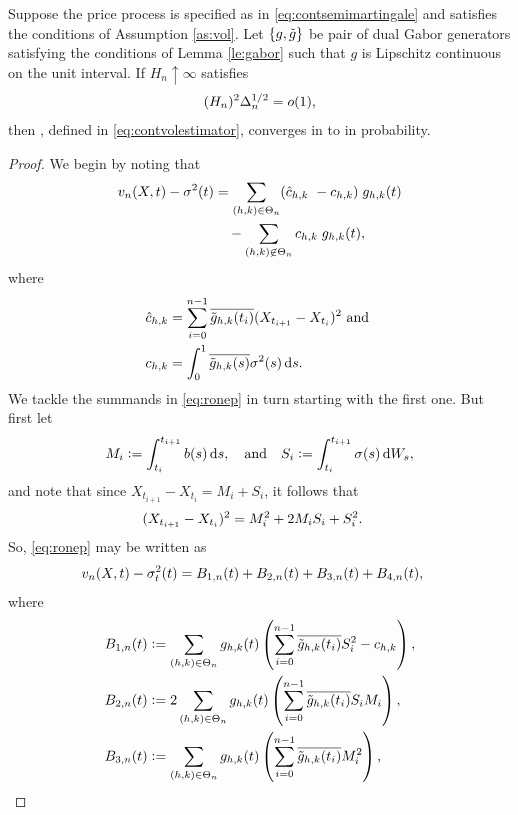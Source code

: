 \begin{prop}\label{pro:finite}
  Suppose the  price process is specified as in \eqref{eq:contsemimartingale} and satisfies the conditions of Assumption \ref{as:vol}. Let $\{g, \tilde{g}\}$ be pair of dual Gabor generators satisfying the conditions of Lemma \ref{le:gabor} such that $g$ is Lipschitz continuous on the unit interval. 
If $H_n \uparrow \infty$ satisfies 
  \begin{align}
    (H_n)^2 \Delta_n^{1/2} = o(1),\notag
    \label{}
  \end{align}
  then
  \svnx, defined in \eqref{eq:contvolestimator}, converges in \Ltwo to \sv in probability.
\end{prop}
\begin{proof} We begin by noting that 
\begin{align}
  v_n(X, t) - \sigma^2(t) & = \sum_{(h,k) \in \Theta_n} (\hat{c}_{h,k}\ - {c}_{h,k})\;g_{h,k}(t)\notag\\
  & \quad -\sum_{(h,k) \not\in \Theta_n} {c}_{h,k}\;g_{h,k}(t),\label{eq:ronep} 
\end{align}
  where 
\begin{align}  
  \cnhk &= \sum_{i =0}^{n-1} \btghki (X_{t_{i+1}} - X_{t_i})^2 \text{ and }\notag\\  
  \chk &= \int^1_0 \btghks \sigma^2(s) \D s. \notag
\end{align}
We tackle the summands in \eqref{eq:ronep} in turn starting with the first one. But first let 
\begin{align}
  M_i := \int_{t_i}^{t_{i+1}} b(s) \D s, \quad \text{and} \quad  S_i := \int_{t_i}^{t_{i+1}} \sigma(s) \D W_s, \notag
\end{align}
and note that since $X_{t_{i+1}} - X_{t_i} = M_i + S_i$, it follows that
\begin{align}
  (X_{t_{i+1}} - X_{t_i})^2 &= M_i^2  
  + 2M_iS_i +   S_i^2.\notag 
\end{align}
So, \eqref{eq:ronep} may be written as 
\begin{align}
  &v_n(X, t) - \sigma_t^2(t) = B_{1,n}(t) + B_{2,n}(t) + B_{3,n}(t) + B_{4,n}(t), \notag
\end{align}
where
\begin{align}
  &B_{1,n}(t) :=  \sumt g_{h,k}(t) \left(\sum_{i=0}^{n-1} \btghki S_i^2  - \chk\right), \notag\\
  &B_{2,n}(t) := 2 \sumt g_{h,k}(t)\left(\sum_{i=0}^{n-1} \btghki S_i M_i \right), \notag\\
  &B_{3,n}(t) := \sumt g_{h,k}(t)\left( \sum_{i=0}^{n-1} \btghki M_i^2 \right), \notag\\

\end{align}
\end{proof}
